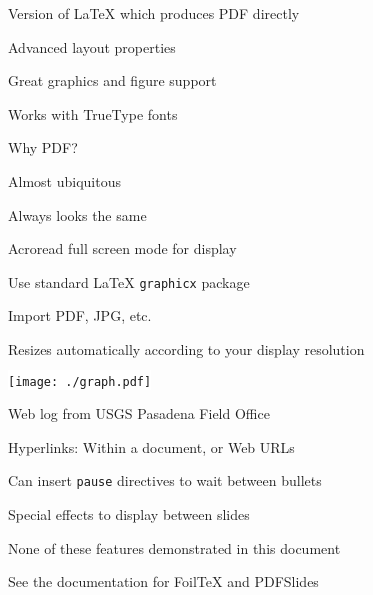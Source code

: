 \documentclass[20pt,landscape]{foils}
\begin{document}

\begin{list1}
\item Version of LaTeX which produces PDF directly 
	\begin{list2}
	\item Advanced layout properties
	\item Great graphics and figure support
	\item Works with TrueType fonts
	\end{list2}

\item Why PDF?
	\begin{list2}
	\item Almost ubiquitous
	\item Always looks the same
	\item Acroread {\blueem full screen mode} for display
	\end{list2}
\end{list1}





\begin{list1}
\item Use standard LaTeX {\tt graphicx} package 
	\begin{list2}
	\item Import PDF, JPG, etc. 
	\item Resizes automatically according to your display resolution
	\end{list2}
\end{list1}

\begin{center}
\colorbox{white}{\texttt{[image: ./graph.pdf]}}  

{\blueem Web log from USGS Pasadena Field Office}
\end{center}


\begin{list1}
\item Hyperlinks: Within a document, or Web URLs

\item Can insert {\tt pause} directives to wait between bullets

\item Special effects to display between slides
\begin{list2}
\item None of these features demonstrated in this document
\item See the documentation for FoilTeX and PDFSlides
\end{list2}
\end{list1}
\end{document}
